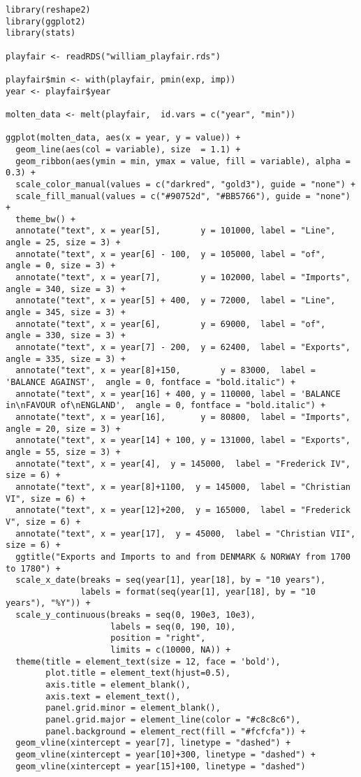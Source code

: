 \documentclass[
]{article}
\begin{document}
\begin{verbatim}
library(reshape2)
library(ggplot2)
library(stats)

playfair <- readRDS("william_playfair.rds")

playfair$min <- with(playfair, pmin(exp, imp))
year <- playfair$year

molten_data <- melt(playfair,  id.vars = c("year", "min"))

ggplot(molten_data, aes(x = year, y = value)) + 
  geom_line(aes(col = variable), size  = 1.1) +
  geom_ribbon(aes(ymin = min, ymax = value, fill = variable), alpha = 0.3) +
  scale_color_manual(values = c("darkred", "gold3"), guide = "none") + 
  scale_fill_manual(values = c("#90752d", "#BB5766"), guide = "none") + 
  theme_bw() + 
  annotate("text", x = year[5],        y = 101000, label = "Line", angle = 25, size = 3) +
  annotate("text", x = year[6] - 100,  y = 105000, label = "of",  angle = 0, size = 3) +
  annotate("text", x = year[7],        y = 102000, label = "Imports", angle = 340, size = 3) +
  annotate("text", x = year[5] + 400,  y = 72000,  label = "Line",  angle = 345, size = 3) +
  annotate("text", x = year[6],        y = 69000,  label = "of",  angle = 330, size = 3) +
  annotate("text", x = year[7] - 200,  y = 62400,  label = "Exports",  angle = 335, size = 3) +
  annotate("text", x = year[8]+150,        y = 83000,  label = 'BALANCE AGAINST',  angle = 0, fontface = "bold.italic") +
  annotate("text", x = year[16] + 400, y = 110000, label = 'BALANCE in\nFAVOUR of\nENGLAND',  angle = 0, fontface = "bold.italic") +
  annotate("text", x = year[16],       y = 80800,  label = "Imports",  angle = 20, size = 3) +
  annotate("text", x = year[14] + 100, y = 131000, label = "Exports",  angle = 55, size = 3) +
  annotate("text", x = year[4],  y = 145000,  label = "Frederick IV", size = 6) +
  annotate("text", x = year[8]+1100,  y = 145000,  label = "Christian VI", size = 6) +
  annotate("text", x = year[12]+200,  y = 165000,  label = "Frederick V", size = 6) +
  annotate("text", x = year[17],  y = 45000,  label = "Christian VII", size = 6) +
  ggtitle("Exports and Imports to and from DENMARK & NORWAY from 1700 to 1780") + 
  scale_x_date(breaks = seq(year[1], year[18], by = "10 years"), 
               labels = format(seq(year[1], year[18], by = "10 years"), "%Y")) + 
  scale_y_continuous(breaks = seq(0, 190e3, 10e3), 
                     labels = seq(0, 190, 10),
                     position = "right",
                     limits = c(10000, NA)) +
  theme(title = element_text(size = 12, face = 'bold'),
        plot.title = element_text(hjust=0.5),
        axis.title = element_blank(),
        axis.text = element_text(), 
        panel.grid.minor = element_blank(),
        panel.grid.major = element_line(color = "#c8c8c6"),
        panel.background = element_rect(fill = "#fcfcfa")) +
  geom_vline(xintercept = year[7], linetype = "dashed") +
  geom_vline(xintercept = year[10]+300, linetype = "dashed") +
  geom_vline(xintercept = year[15]+100, linetype = "dashed")
\end{verbatim}
\end{document}
